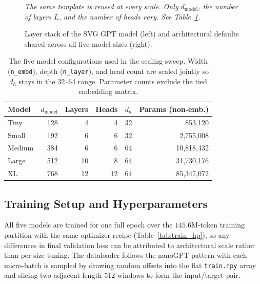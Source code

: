\documentclass[a4paper]{article}
\begin{document}
\begin{figure}[h]
\begin{minipage}[t]{0.55\linewidth}
        \vspace{6pt}
        \emph{The same template is reused at every scale. Only $d_{\text{model}}$, the number of layers $L$, and the number of heads vary. See Table~\ref{tab:model_configs}.}
    \end{minipage}
    \caption{Layer stack of the SVG GPT model (left) and architectural defaults shared across all five model sizes (right).}
    \label{fig:arch}
\end{figure}

\begin{table}[H]
\centering
\small
\begin{tabular}{lrrrrr}
\toprule
Model & $d_{\text{model}}$ & Layers & Heads & $d_h$ & Params (non-emb.) \\
\midrule
Tiny   & 128 & 4  & 4  & 32 & 853{,}120     \\
Small  & 192 & 6  & 6  & 32 & 2{,}755{,}008   \\
Medium & 384 & 6  & 6  & 64 & 10{,}818{,}432  \\
Large  & 512 & 10 & 8  & 64 & 31{,}730{,}176  \\
XL     & 768 & 12 & 12 & 64 & 85{,}347{,}072    \\
\bottomrule
\end{tabular}
\caption{The five model configurations used in the scaling sweep. Width (\texttt{n\_embd}), depth (\texttt{n\_layer}), and head count are scaled jointly so $d_h$ stays in the 32--64 range. Parameter counts exclude the tied embedding matrix.}
\label{tab:model_configs}
\end{table}

\subsection{Training Setup and Hyperparameters}

All five models are trained for one full epoch over the $145.6$M-token training partition with the same optimizer recipe (Table~\ref{tab:train_hp}), so any differences in final validation loss can be attributed to architectural scale rather than per-size tuning. The dataloader follows the nanoGPT pattern with each micro-batch is sampled by drawing random offsets into the flat \texttt{train.npy} array and slicing two adjacent length-512 windows to form the input/target pair.
\end{document}
